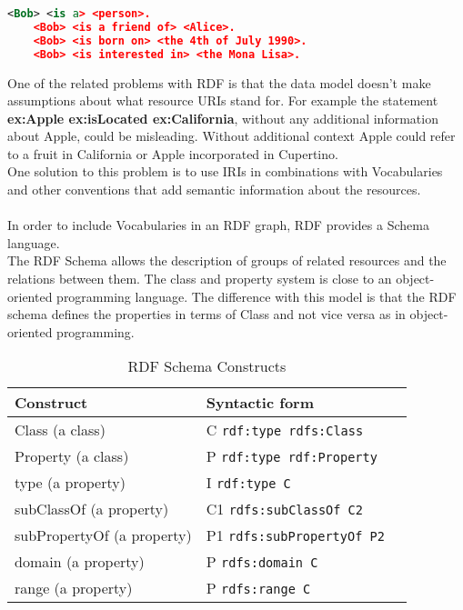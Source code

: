 \begin{lstlisting}[language=XML, caption={RDF Grouped Data}, label={lst:xml-rdf-grouped-example}, frame=single]
	<Bob> <is a> <person>.
	<Bob> <is a friend of> <Alice>.
	<Bob> <is born on> <the 4th of July 1990>.
	<Bob> <is interested in> <the Mona Lisa>.
\end{lstlisting}
One of the related problems with RDF is that the data model doesn't make assumptions about what resource URIs stand for.
For example the statement \space \textbf{ex:Apple ex:isLocated ex:California}, without any additional information about Apple, could be misleading. Without additional context Apple could refer to a fruit in California or Apple incorporated in Cupertino.
\\
One solution to this problem is to use IRIs in combinations with Vocabularies and other conventions that add semantic information about the resources.
\\
\\
In order to include Vocabularies in an RDF graph, RDF provides a Schema language.
\\
The RDF Schema allows the description of groups of related resources and the relations between them.
The class and property system is close to an object-oriented programming language. The difference with this model is that the RDF schema defines the properties in terms of Class and not vice versa as in object-oriented programming.
\begin{table}[h]
    \centering
    \begin{tabular}{lll}
        \toprule
        \textbf{Construct} & \textbf{Syntactic form} \\
        \midrule
        Class (a class) & C \texttt{rdf:type rdfs:Class}  \\
        Property (a class) & P \texttt{rdf:type rdf:Property} \\
        type (a property) & I \texttt{rdf:type C} \\
        subClassOf (a property) & C1 \texttt{rdfs:subClassOf C2} \\
        subPropertyOf (a property) & P1 \texttt{rdfs:subPropertyOf P2} \\
        domain (a property) & P \texttt{rdfs:domain C} \\
        range (a property) & P \texttt{rdfs:range C} \\
        \bottomrule
    \end{tabular}
    \caption{RDF Schema Constructs}
    \label{tab:rdf_schema_constructs}
\end{table}

